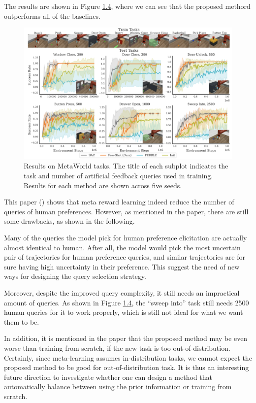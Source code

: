 \documentclass[
  letterpaper,
  DIV=11,
  numbers=noendperiod,
  oneside]{scrreprt}
\theoremstyle{remark}
\begin{document}
The results are shown in Figure \hyperref[fig:few-exp]{1.4}, where we
can see that the proposed methord outperforms all of the baselines.

\begin{figure}

{\centering \includegraphics{src/Figures/few-exp.png}

}

\caption{Results on MetaWorld tasks. The title of each subplot indicates
the task and number of artificial feedback queries used in training.
Results for each method are shown across five seeds.}

\end{figure}%

This paper ()
shows that meta reward learning indeed reduce the number of queries of
human preferences. However, as mentioned in the paper, there are still
some drawbacks, as shown in the following.

Many of the queries the model pick for human preference elicitation are
actually almost identical to human. After all, the model would pick the
most uncertain pair of trajectories for human preference queries, and
similar trajectories are for sure having high uncertainty in their
preference. This suggest the need of new ways for designing the query
selection strategy.

Moreover, despite the improved query complexity, it still needs an
impractical amount of queries. As shown in Figure
\hyperref[fig:few-exp]{1.4}, the ``sweep into'' task still needs 2500
human queries for it to work properly, which is still not ideal for what
we want them to be.

In addition, it is mentioned in the paper that the proposed method may
be even worse than training from scratch, if the new task is too
out-of-distribution. Certainly, since meta-learning assumes
in-distribution tasks, we cannot expect the proposed method to be good
for out-of-distribution task. It is thus an interesting future direction
to investigate whether one can design a method that automatically
balance between using the prior information or training from scratch.
\end{document}
